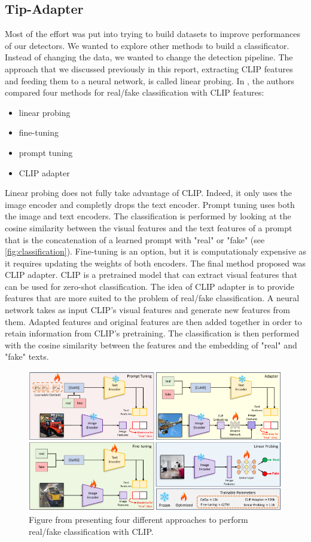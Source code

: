\documentclass[12pt,a4paper]{article}
\begin{document}
\subsection{Tip-Adapter}
Most of the effort was put into trying to build datasets to improve performances of our detectors. We wanted to explore other methods to build a classificator. Instead of changing the data, we wanted to change the detection pipeline. The approach that we discussed previously in this report, extracting CLIP features and feeding them to a neural network, is called linear probing. In \autocite*{khanCLIPpingDeceptionAdapting2024}, the authors compared four methods for real/fake classification with CLIP features:
\begin{itemize}
    \item linear probing
    \item fine-tuning
    \item prompt tuning
    \item CLIP adapter
\end{itemize}
Linear probing does not fully take advantage of CLIP. Indeed, it only uses the image encoder and completly drops the text encoder. Prompt tuning uses both the image and text encoders. The classification is performed by looking at the cosine similarity between the visual features and the text features of a prompt that is the concatenation of a learned prompt with "real" or "fake" (see \autoref*{fig:classification}).
Fine-tuning is an option, but it is computationaly expensive as it requires updating the weights of both encoders. The final method proposed was CLIP adapter. CLIP is a pretrained model that can extract visual features that can be used for zero-shot classification. The idea of CLIP adapter is to provide features that are more suited to the problem of real/fake classification. A neural network takes as input CLIP's visual features and generate new features from them. Adapted features and original features are then added together in order to retain information from CLIP's pretraining. The classification is then performed with the cosine similarity between the features and the embedding of "real" and "fake" texts. 

\begin{figure}[H]
    \includegraphics*[width=\textwidth]{img/classification.png}
    \caption{Figure from \autocite*{khanCLIPpingDeceptionAdapting2024} presenting four different approaches to perform real/fake classification with CLIP.}
    \label{fig:classification}
\end{figure}
\end{document}

